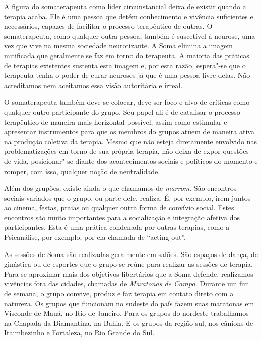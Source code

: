 A figura do somaterapeuta como líder circunstancial deixa de existir
quando a terapia acaba. Ele é uma pessoa que detém conhecimento e
vivência suficientes e necessários, capazes de facilitar o processo
terapêutico de outras. O somaterapeuta, como qualquer outra pessoa,
também é suscetível à neurose, uma vez que vive na mesma sociedade
neurotizante. A Soma elimina a imagem mitificada que geralmente se faz
em torno do terapeuta. A maioria das práticas de terapias existentes
sustenta esta imagem e, por esta razão, espera"-se que o terapeuta tenha
o poder de curar neuroses já que é uma pessoa livre delas. Não
acreditamos nem aceitamos essa visão autoritária e irreal.

O somaterapeuta também deve se colocar, deve ser foco e alvo de críticas
como qualquer outro participante do grupo. Seu papel ali é de catalisar
o processo terapêutico de maneira mais horizontal possível, assim como
estimular e apresentar instrumentos para que os membros do grupos atuem
de maneira ativa na produção coletiva da terapia. Mesmo que não esteja
diretamente envolvido nas problematizações em torno de sua própria
terapia, não deixa de expor questões de vida, posicionar"-se diante dos
acontecimentos sociais e políticos do momento e romper, com isso,
qualquer noção de neutralidade.

Além dos grupões, existe ainda o que chamamos de \emph{marrom}. São
encontros sociais variados que o grupo, ou parte dele, realiza. É, por
exemplo, irem juntos ao cinema, festas, praias ou qualquer outra forma
de convívio social. Estes encontros são muito importantes para a
socialização e integração afetiva dos participantes. Esta é uma prática
condenada por outras terapias, como a Psicanálise, por exemplo, por ela
chamada de ``acting out''.

As sessões de Soma são realizadas geralmente em salões. São espaços de
dança, de ginástica ou de esportes que o grupo se reúne para realizar as
sessões de terapia. Para se aproximar mais dos objetivos libertários que
a Soma defende, realizamos vivências fora das cidades, chamadas de
\emph{Maratonas de Campo.} Durante um fim de semana, o grupo convive,
produz e faz terapia em contato direto com a natureza. Os grupos que
funcionam no sudeste do país fazem suas maratonas em Visconde de Mauá,
no Rio de Janeiro. Para os grupos do nordeste trabalhamos na Chapada da
Diamantina, na Bahia. E os grupos da região sul, nos cânions de
Itaimbezinho e Fortaleza, no Rio Grande do Sul.

